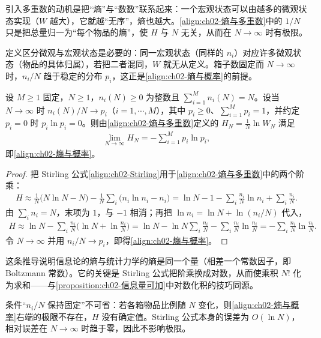 \documentclass[../../main.tex]{subfiles}
\begin{document}
\begin{remark}
引入多重数的动机是把“熵”与“数数”联系起来：一个宏观状态可以由越多的微观状态实现（$W$ 越大），它就越“无序”，熵也越大。\eqref{align:ch02-熵与多重数}中的 $1/N$ 只是把总量归一为“每个物品的熵”，使 $H$ 与 $N$ 无关，从而在 $N\to\infty$ 时有极限。

定义区分微观与宏观状态是必要的：同一宏观状态（同样的 $n_i$）对应许多微观状态（物品的具体归属），若把二者混同，$W$ 就无从定义。箱子数固定而 $N\to\infty$ 时，$n_i/N$ 趋于稳定的分布 $p_i$，这正是\eqref{align:ch02-熵与概率}的前提。
\end{remark}

\begin{proposition}[熵的统计力学表达式]\label{proposition:ch02-熵与多重数}
设 $M\geqslant1$ 固定，$N\geqslant1$，$n_i(N)\geqslant0$ 为整数且 $\sum_{i=1}^{M}n_i(N)=N$。设当 $N\to\infty$ 时 $n_i(N)/N\to p_i$（$i=1,\cdots,M$），其中 $p_i\geqslant0$、$\sum_{i=1}^{M}p_i=1$，并约定 $p_i=0$ 时 $p_i\ln p_i=0$。则由\eqref{align:ch02-熵与多重数}定义的 $H_N=\frac{1}{N}\ln W_N$ 满足
\begin{align*}
  \lim_{N\to\infty}H_N=-\sum_{i=1}^{M}p_i\ln p_i,
\end{align*}
即\eqref{align:ch02-熵与概率}。
\end{proposition}

\begin{proof}
把 Stirling 公式\eqref{align:ch02-Stirling}用于\eqref{align:ch02-熵与多重数}中的两个阶乘：
\begin{align*}
  H \approx \frac{1}{N}\big(N\ln N - N\big) - \frac{1}{N}\sum_i\big(n_i\ln n_i - n_i\big)
  = \ln N - 1 - \sum_i\frac{n_i}{N}\ln n_i + \sum_i\frac{n_i}{N} .
\end{align*}
由 $\sum_in_i=N$，末项为 $1$，与 $-1$ 相消；再把 $\ln n_i=\ln N+\ln(n_i/N)$ 代入，
\begin{align*}
  H \approx \ln N - \sum_i\frac{n_i}{N}\Big(\ln N + \ln\frac{n_i}{N}\Big)
  = \ln N - \ln N\sum_i\frac{n_i}{N} - \sum_i\frac{n_i}{N}\ln\frac{n_i}{N}
  = -\sum_i\frac{n_i}{N}\ln\frac{n_i}{N} .
\end{align*}
令 $N\to\infty$ 并用 $n_i/N\to p_i$，即得\eqref{align:ch02-熵与概率}。
\end{proof}

\begin{remark}
这条推导说明信息论的熵与统计力学的熵是同一个量（相差一个常数因子，即 Boltzmann 常数）。它的关键是 Stirling 公式把阶乘换成对数，从而使乘积 $N!$ 化为求和——与\cref{proposition:ch02-信息量可加}中对数化积的技巧同源。

条件“$n_i/N$ 保持固定”不可省：若各箱物品比例随 $N$ 变化，则\eqref{align:ch02-熵与概率}右端的极限不存在，$H$ 没有确定值。Stirling 公式本身的误差为 $O(\ln N)$，相对误差在 $N\to\infty$ 时趋于零，因此不影响极限。
\end{remark}
\end{document}

